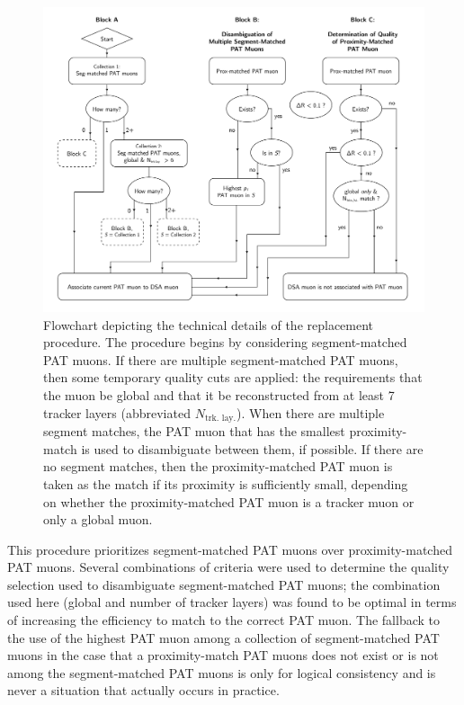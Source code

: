 \begin{figure}[p]
  \centering
  \includegraphics[width=\textwidth]{figures/displaced/ReplacementDiagram.pdf}
  \caption{Flowchart depicting the technical details of the \DSAToPAT replacement procedure. The procedure begins by considering segment-matched PAT muons. If there are multiple segment-matched PAT muons, then some temporary quality cuts are applied: the requirements that the muon be global and that it be reconstructed from at least 7 tracker layers (abbreviated $N_\text{trk. lay.}$). When there are multiple segment matches, the PAT muon that has the smallest proximity-match \deltaR is used to disambiguate between them, if possible. If there are no segment matches, then the proximity-matched PAT muon is taken as the match if its proximity \deltaR is sufficiently small, depending on whether the proximity-matched PAT muon is a tracker muon or only a global muon.}
  \label{fig:dd:RepDiagram}
\end{figure}

This procedure prioritizes segment-matched PAT muons over proximity-matched PAT muons.
Several combinations of criteria were used to determine the quality selection used to disambiguate segment-matched PAT muons; the combination used here (global and number of tracker layers) was found to be optimal in terms of increasing the efficiency to match to the correct PAT muon.
The fallback to the use of the highest \pT PAT muon among a collection of segment-matched PAT muons in the case that a proximity-match PAT muons does not exist or is not among the segment-matched PAT muons is only for logical consistency and is never a situation that actually occurs in practice.

